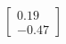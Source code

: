 \documentclass[preview]{standalone}
\begin{document}
\begin{align*}
\begin{bmatrix} 0.19 \\ -0.47 \end{bmatrix}
\end{align*}
\end{document}
